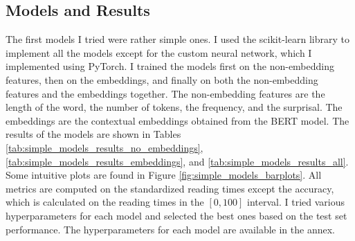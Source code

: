 \subsection{Models and Results}
The first models I tried were rather simple ones. I used the scikit-learn library to implement all the models except for the custom neural network, which I implemented using PyTorch.
I trained the models first on the non-embedding features, then on the embeddings, and finally on both the non-embedding features and the embeddings together. The non-embedding features are the length of the word, the number of tokens, the frequency, and the surprisal. The embeddings are the contextual embeddings obtained from the BERT model. The results of the models are shown in Tables \ref{tab:simple_models_results_no_embeddings}, \ref{tab:simple_models_results_embeddings}, and \ref{tab:simple_models_results_all}. Some intuitive plots are found in Figure \ref{fig:simple_models_barplots}. All metrics are computed on the standardized reading times except the accuracy, which is calculated on the reading times in the \([0, 100]\) interval. I tried various hyperparameters for each model and selected the best ones based on the test set performance. The hyperparameters for each model are available in the annex.

